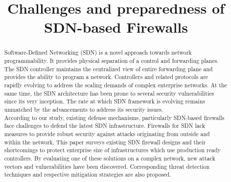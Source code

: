 \documentclass[sigconf]{acmart}
\begin{document}
\title{Challenges and preparedness of SDN-based Firewalls}

\begin{comment}
\author{}
\authornote{Dr.~Trovato insisted his name be first.}
\orcid{1234-5678-9012}
\affiliation{%
  \institution{Institute for Clarity in Documentation}
  \streetaddress{P.O. Box 1212}
  \city{Dublin} 
  \state{Ohio} 
  \postcode{43017-6221}
}
\email{trovato@corporation.com}

\renewcommand{\shortauthors}{B. Trovato et al.}
\end{comment}

\begin{abstract}
	Software-Defined Networking (SDN) is a novel approach towards network programmability. It provides physical separation of a control and forwarding planes. The SDN controller maintains the centralized view of entire forwarding plane and provides the ability to program a network. Controllers and related protocols are rapidly evolving to address the scaling demands of complex enterprise networks. At the same time, the SDN architecture has been prone to several security vulnerabilities since its very inception. The rate at which SDN framework is evolving remains unmatched by the advancements to address its security issues. \\ 
	According to our study, existing defense mechanisms, particularly SDN-based firewalls face challenges to defend the latest SDN infrastructure. Firewalls for SDN lack measures to provide robust security against attacks originating from outside and within the network. This paper surveys existing SDN firewall designs and their shortcomings to protect enterprise size of infrastructures which use production ready controllers. By evaluating one of these solutions on a complex network, new attack vectors and vulnerabilities have been discovered. Corresponding threat detection techniques and respective mitigation strategies are also proposed.
\end{abstract}
\end{document}
